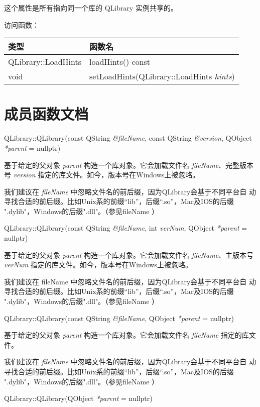 \begin{notice}
这个属性是所有指向同一个库的 QLibrary 实例共享的。
\end{notice}

访问函数：

\begin{tabular}{|l|l|}
\hline
类型 	&函数名\\
\hline
QLibrary::LoadHints &	loadHints() const\\
\hline
void &	setLoadHints(QLibrary::LoadHints \emph{hints})\\
\hline
\end{tabular}

\section{成员函数文档}

QLibrary::QLibrary(const QString \emph{\&fileName}, const QString \emph{\&version}, QObject \emph{*parent} = nullptr)

基于给定的父对象 \emph{parent} 构造一个库对象。它会加载文件名 \emph{fileName}、完整版本号 \emph{version} 指定的库文件。如今，版本号在Windows上被忽略。

我们建议在 \emph{fileName} 中忽略文件名的前后缀，因为QLibrary会基于不同平台自
动寻找合适的前后缀。比如Unix系的前缀“lib”，后缀“.so”，Mac及IOS的后缀
".dylib"，Windows的后缀".dll"。（参见fileName ）

QLibrary::QLibrary(const QString \emph{\&fileName}, int \emph{verNum}, QObject \emph{*parent} = nullptr)

基于给定的父对象 \emph{parent} 构造一个库对象。它会加载文件名 \emph{fileName}、主版本号 \emph{verNum} 指定的库文件。如今，版本号在Windows上被忽略。

我们建议在 fileName 中忽略文件名的前后缀，因为QLibrary会基于不同平台自
动寻找合适的前后缀。比如Unix系的前缀“lib”，后缀“.so”，Mac及IOS的后缀
".dylib"，Windows的后缀".dll"。（参见fileName ）

QLibrary::QLibrary(const QString \emph{\&fileName}, QObject
\emph{*parent} = nullptr)

基于给定的父对象 \emph{parent} 构造一个库对象。它会加载文件名 \emph{fileName} 指定的库文件。

我们建议在 
\emph{fileName} 中忽略文件名的前后缀，因为QLibrary会基于不同平台自
动寻找合适的前后缀。比如Unix系的前缀“lib”，后缀“.so”，Mac及IOS的后缀
".dylib"，Windows的后缀".dll"。（参见fileName ）

QLibrary::QLibrary(QObject \emph{*parent} = nullptr)

